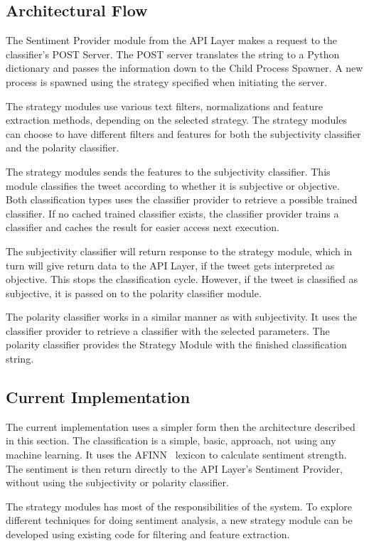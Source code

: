 \subsection{Architectural Flow}

The Sentiment Provider module from the API Layer makes a request to the classifier's POST Server. The POST server translates the string to a Python dictionary and passes the information down to the Child Process Spawner. A new process is spawned using the strategy specified when initiating the server. 

The strategy modules use various text filters, normalizations and feature extraction methods, depending on the selected strategy. The strategy modules can choose to have different filters and features for both the subjectivity classifier and the polarity classifier. 

The strategy modules sends the features to the subjectivity classifier. This module classifies the tweet according to whether it is subjective or objective. Both classification types uses the classifier provider to retrieve a possible trained classifier. If no cached trained classifier exists, the classifier provider trains a classifier and caches the result for easier access next execution. 

The subjectivity classifier will return response to the strategy module, which in turn will give return data to the API Layer, if the tweet gets interpreted as objective. This stops the classification cycle. However, if the tweet is classified as subjective, it is passed on to the polarity classifier module. 

The polarity classifier works in a similar manner as with subjectivity. It uses the classifier provider to retrieve a classifier with the selected parameters. The polarity classifier provides the Strategy Module with the finished classification string.


\subsection{Current Implementation}

The current implementation uses a simpler form then the architecture described in this section. The classification is a simple, basic, approach, not using any machine learning. It uses the AFINN~\cite{article:afinn} lexicon to calculate sentiment strength. The sentiment is then return directly to the API Layer's Sentiment Provider, without using the subjectivity or polarity classifier.

The strategy modules has most of the responsibilities of the system. To explore different techniques for doing sentiment analysis, a new strategy module can be developed using existing code for filtering and feature extraction. 
